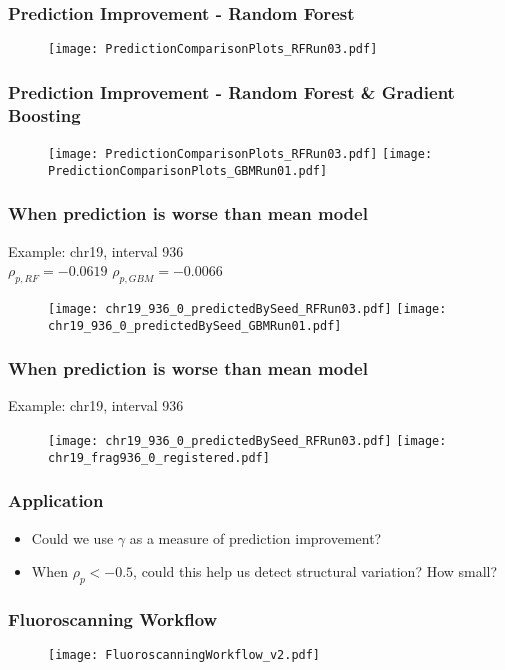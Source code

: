\documentclass[10pt,dvipsnames,table]{beamer}
\begin{document}
\begin{frame}
\frametitle{Prediction Improvement - Random Forest}
\begin{figure}
\texttt{[image: PredictionComparisonPlots\_RFRun03.pdf]}
\end{figure}
\end{frame}

\begin{frame}
\frametitle{Prediction Improvement - Random Forest \& Gradient Boosting}
\begin{figure}
\texttt{[image: PredictionComparisonPlots\_RFRun03.pdf]}
\texttt{[image: PredictionComparisonPlots\_GBMRun01.pdf]}
\end{figure}
\end{frame}

\begin{frame}
\frametitle{When prediction is worse than mean model}
Example: chr19, interval 936 \\
 $\rho_{p, RF} = -0.0619$ \hspace{1.5in} $\rho_{p, GBM} = -0.0066$
\begin{figure}
\texttt{[image: chr19\_936\_0\_predictedBySeed\_RFRun03.pdf]}
\texttt{[image: chr19\_936\_0\_predictedBySeed\_GBMRun01.pdf]}
\end{figure}
\end{frame}

\begin{frame}
\frametitle{When prediction is worse than mean model}
Example: chr19, interval 936 \\
\begin{figure}
\texttt{[image: chr19\_936\_0\_predictedBySeed\_RFRun03.pdf]}
\texttt{[image: chr19\_frag936\_0\_registered.pdf]}
\end{figure}

\end{frame}

\begin{frame}
\frametitle{Application}
\begin{itemize}
\item Could we use $\gamma$ as a measure of prediction improvement?
\vspace{1cm}
\item When $\rho_{p} < -0.5$, could this help us detect structural variation? How small?
\end{itemize}
\end{frame}

\begin{frame}
\frametitle{Fluoroscanning Workflow}
\vspace{-0.5cm}
\begin{figure}
\texttt{[image: FluoroscanningWorkflow\_v2.pdf]}
\end{figure}

\end{frame}
\end{document}
